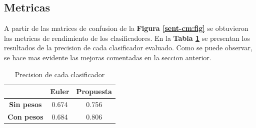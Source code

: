 \documentclass[a4paper]{article}
\newcommand{\reffig}[1]{\textbf{Figura \ref{#1}}}
\newcommand{\reftable}[1]{\textbf{Tabla \ref{#1}}}
\begin{document}
\subsection{Metricas}
A partir de las matrices de confusion de la \reffig{sent-cm:fig} se obtuvieron las metricas de rendimiento de los clasificadores. En la \reftable{tab:sent-prec} se presentan los resultados de la precision de cada clasificador evaluado. Como se puede observar, se hace mas evidente las mejoras comentadas en la seccion anterior.

\begin{table}[h]
  \centering
  \begin{tabular}{@{}ccc@{}}
    \toprule
    \multicolumn{1}{l}{} & \textbf{Euler} & \textbf{Propuesta} \\ \midrule
    \textbf{Sin pesos}   & 0.674          & 0.756              \\
    \textbf{Con pesos}   & 0.684          & 0.806              \\ \bottomrule
    \end{tabular}
  \caption{Precision de cada clasificador}
  \label{tab:sent-prec}
  \end{table}
\end{document}
